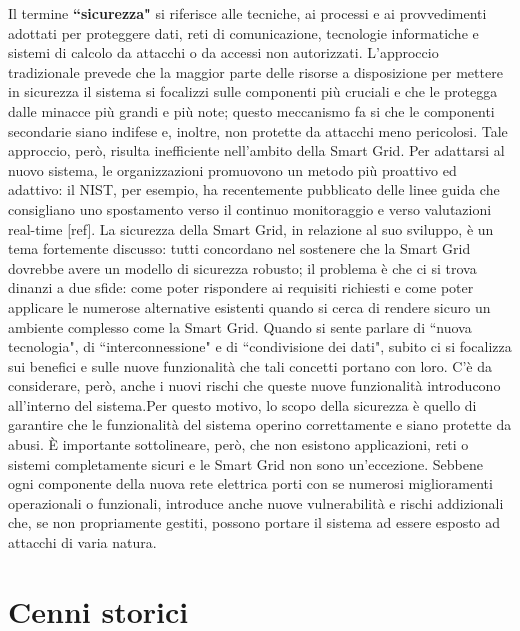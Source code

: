 Il termine \textbf{``sicurezza"} si riferisce alle tecniche, ai processi e ai provvedimenti adottati per proteggere dati, reti di comunicazione, tecnologie informatiche e sistemi di calcolo da attacchi o da accessi non autorizzati. \newline
L'approccio tradizionale prevede che la maggior parte delle risorse a disposizione per mettere in sicurezza il sistema si focalizzi sulle componenti più cruciali e che le protegga dalle minacce più grandi e più note; questo meccanismo fa si che le componenti secondarie siano indifese e, inoltre, non protette da attacchi meno pericolosi. Tale approccio, però, risulta inefficiente nell'ambito della Smart Grid. \newline Per adattarsi al nuovo sistema, le organizzazioni promuovono un metodo più proattivo ed adattivo: il NIST, per esempio, ha recentemente pubblicato delle linee guida che consigliano uno spostamento verso il continuo monitoraggio e verso valutazioni real-time [ref].\newline \newline
La sicurezza della Smart Grid, in relazione al suo sviluppo, è un tema fortemente discusso: tutti concordano nel sostenere che la Smart Grid dovrebbe avere un modello di sicurezza robusto; il problema è che ci si trova dinanzi a due sfide: come poter rispondere ai requisiti richiesti e come poter applicare le numerose alternative esistenti quando si cerca di rendere sicuro un ambiente complesso come la Smart Grid.
\newline \newline
Quando si sente parlare di ``nuova tecnologia", di ``interconnessione" e di ``condivisione dei dati", subito ci si focalizza sui benefici e sulle nuove funzionalità che tali concetti portano con loro. C'è da considerare, però, anche i nuovi rischi che queste nuove funzionalità introducono all'interno del sistema.\newline Per questo motivo, lo scopo della sicurezza è quello di garantire che le funzionalità del sistema operino correttamente e siano protette da abusi. È importante sottolineare, però, che non esistono applicazioni, reti o sistemi completamente sicuri e le Smart Grid non sono un'eccezione. Sebbene ogni componente della nuova rete elettrica porti con se numerosi miglioramenti operazionali  o funzionali, introduce anche nuove vulnerabilità e rischi addizionali che, se non propriamente gestiti, possono portare il sistema ad essere esposto ad attacchi di varia natura.
\section{Cenni storici}

